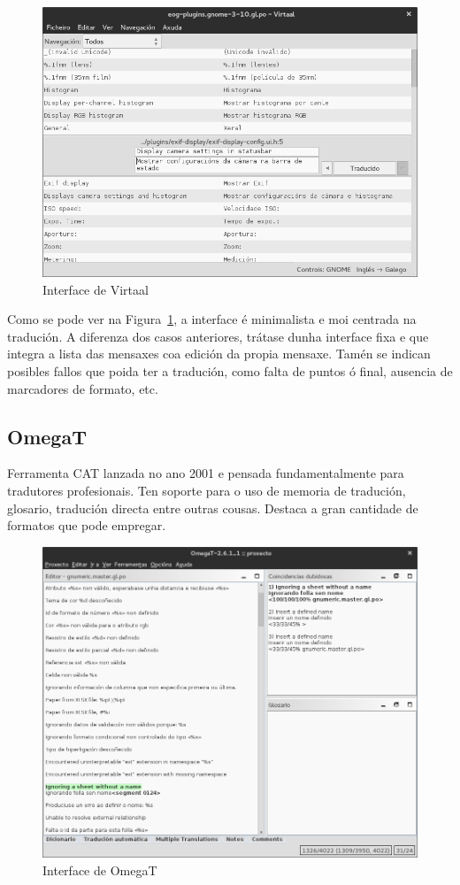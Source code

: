 \begin{figure}[h]
    \centering
    \includegraphics[width=\textwidth]{img/captura_virtaal.png}
    \caption{Interface de Virtaal}
    \label{fig:virtaal}
\end{figure}

Como se pode ver na Figura~\ref{fig:virtaal}, a interface é minimalista e moi centrada na tradución. A diferenza dos casos anteriores, trátase dunha interface fixa e que integra a lista das mensaxes coa edición da propia mensaxe. Tamén se indican posibles fallos que poida ter a tradución, como falta de puntos ó final, ausencia de marcadores de formato, etc.

\subsection{OmegaT}
Ferramenta CAT\cite{website:omegat} lanzada no ano 2001 e pensada fundamentalmente para tradutores profesionais. Ten soporte para o uso de memoria de tradución, glosario, tradución directa entre outras cousas. Destaca a gran cantidade de formatos que pode empregar.

\begin{figure}[h]
    \centering
    \includegraphics[width=\textwidth]{img/captura_omegat.png}
    \caption{Interface de OmegaT}
    \label{fig:omegat}
\end{figure}

